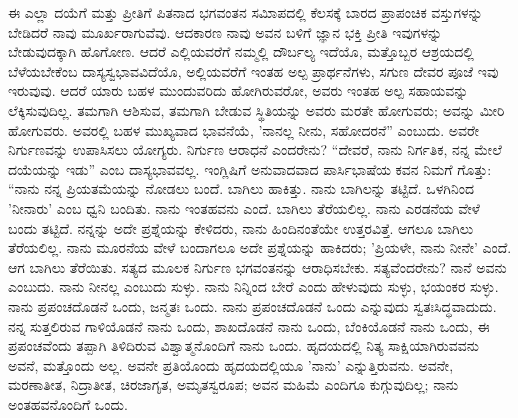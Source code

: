 ಈ ಎಲ್ಲಾ ದಯೆಗೆ ಮತ್ತು ಪ್ರೀತಿಗೆ ಪಿತನಾದ ಭಗವಂತನ ಸಮಿಾಪದಲ್ಲಿ ಕೆಲಸಕ್ಕೆ ಬಾರದ ಪ್ರಾಪಂಚಿಕ ವಸ್ತುಗಳನ್ನು ಬೇಡಿದರೆ ನಾವು ಮೂರ್ಖರಾಗುವೆವು. ಆದಕಾರಣ ನಾವು ಅವನ ಬಳಿಗೆ ಜ್ಞಾನ ಭಕ್ತಿ ಪ್ರೀತಿ ಇವುಗಳನ್ನು ಬೇಡುವುದಕ್ಕಾಗಿ ಹೊಗೋಣ. ಆದರೆ ಎಲ್ಲಿಯವರೆಗೆ ನಮ್ಮಲ್ಲಿ ದೌರ್ಬಲ್ಯ ಇದೆಯೊ, ಮತ್ತೊಬ್ಬರ ಆಶ್ರಯದಲ್ಲಿ ಬೆಳೆಯಬೇಕೆಂಬ ದಾಸ್ಯಸ್ವಭಾವವಿದೆಯೊ, ಅಲ್ಲಿಯವರೆಗೆ ಇಂತಹ ಅಲ್ಪ ಪ್ರಾರ್ಥನೆಗಳು, ಸಗುಣ ದೇವರ ಪೂಜೆ ಇವು ಇರುವುವು. ಆದರೆ ಯಾರು ಬಹಳ ಮುಂದುವರಿದು ಹೋಗಿರುವರೋ, ಅವರು ಇಂತಹ ಅಲ್ಪ ಸಹಾಯವನ್ನು ಲೆಕ್ಕಿಸುವುದಿಲ್ಲ. ತಮಗಾಗಿ ಆಶಿಸುವ, ತಮಗಾಗಿ ಬೇಡುವ ಸ್ಥಿತಿಯನ್ನು ಅವರು ಮರತೇ ಹೋಗುವರು; ಅವನ್ನು ಮೀರಿ ಹೋಗುವರು. ಅವರಲ್ಲಿ ಬಹಳ ಮುಖ್ಯವಾದ ಭಾವನೆಯೆ, 'ನಾನಲ್ಲ ನೀನು, ಸಹೋದರನೆ'' ಎಂಬುದು. ಅವರೇ ನಿರ್ಗುಣವನ್ನು ಉಪಾಸಿಸಲು ಯೋಗ್ಯರು. ನಿರ್ಗುಣ ಆರಾಧನೆ ಎಂದರೇನು? “ದೇವರೆ, ನಾನು ನಿರ್ಗತಿಕ, ನನ್ನ ಮೇಲೆ ದಯೆಯನ್ನು ಇಡು'' ಎಂಬ ದಾಸ್ಯಭಾವವಲ್ಲ. ಇಂಗ್ಲಿಷಿಗೆ ಅನುವಾದವಾದ ಪಾರ್ಸಿಭಾಷೆಯ ಕವನ ನಿಮಗೆ ಗೊತ್ತು: “ನಾನು ನನ್ನ ಪ್ರಿಯತಮೆಯನ್ನು ನೋಡಲು ಬಂದೆ. ಬಾಗಿಲು ಹಾಕಿತ್ತು. ನಾನು ಬಾಗಿಲನ್ನು ತಟ್ಟಿದೆ. ಒಳಗಿನಿಂದ 'ನೀನಾರು' ಎಂಬ ಧ್ವನಿ ಬಂದಿತು. ನಾನು ಇಂತಹವನು ಎಂದೆ. ಬಾಗಿಲು ತೆರೆಯಲಿಲ್ಲ. ನಾನು ಎರಡನೆಯ ವೇಳೆ ಬಂದು ತಟ್ಟಿದೆ. ನನ್ನನ್ನು ಅದೇ ಪ್ರಶ್ನೆಯನ್ನು ಕೇಳಿದರು, ನಾನು ಹಿಂದಿನಂತೆಯೇ ಉತ್ತರವಿತ್ತೆ. ಆಗಲೂ ಬಾಗಿಲು ತೆರೆಯಲಿಲ್ಲ. ನಾನು ಮೂರನೆಯ ವೇಳೆ ಬಂದಾಗಲೂ ಅದೇ ಪ್ರಶ್ನೆಯನ್ನು ಹಾಕಿದರು; 'ಪ್ರಿಯಳೇ, ನಾನು ನೀನೇ' ಎಂದೆ. ಆಗ ಬಾಗಿಲು ತೆರೆಯಿತು. ಸತ್ಯದ ಮೂಲಕ ನಿರ್ಗುಣ ಭಗವಂತನನ್ನು ಆರಾಧಿಸಬೇಕು. ಸತ್ಯವೆಂದರೇನು? ನಾನೆ ಅವನು ಎಂಬುದು. ನಾನು ನೀನಲ್ಲ ಎಂಬುದು ಸುಳ್ಳು. ನಾನು ನಿನ್ನಿಂದ ಬೇರೆ ಎಂದು ಹೇಳುವುದು ಸುಳ್ಳು, ಭಯಂಕರ ಸುಳ್ಳು. ನಾನು ಪ್ರಪಂಚದೊಡನೆ ಒಂದು, ಜನ್ಮತಃ ಒಂದು. ನಾನು ಪ್ರಪಂಚದೊಡನೆ ಒಂದು ಎನ್ನುವುದು ಸ್ವತಃಸಿದ್ಧವಾದುದು. ನನ್ನ ಸುತ್ತಲಿರುವ ಗಾಳಿಯೊಡನೆ ನಾನು ಒಂದು, ಶಾಖದೊಡನೆ ನಾನು ಒಂದು, ಬೆಂಕಿಯೊಡನೆ ನಾನು ಒಂದು, ಈ ಪ್ರಪಂಚವೆಂದು ತಪ್ಪಾಗಿ ತಿಳಿದಿರುವ ವಿಶ್ವಾತ್ಮನೊಂದಿಗೆ ನಾನು ಒಂದು. ಹೃದಯದಲ್ಲಿ ನಿತ್ಯ ಸಾಕ್ಷಿಯಾಗಿರುವವನು ಅವನೆ, ಮತ್ತೊಂದು ಅಲ್ಲ. ಅವನೇ ಪ್ರತಿಯೊಂದು ಹೃದಯದಲ್ಲಿಯೂ 'ನಾನು' ಎನ್ನುತ್ತಿರುವನು. ಅವನೇ, ಮರಣಾತೀತ, ನಿದ್ರಾತೀತ, ಚಿರಜಾಗೃತ, ಅಮೃತಸ್ವರೂಪ; ಅವನ ಮಹಿಮೆ ಎಂದಿಗೂ ಕುಗ್ಗುವುದಿಲ್ಲ; ನಾನು ಅಂತಹವನೊಂದಿಗೆ ಒಂದು.


